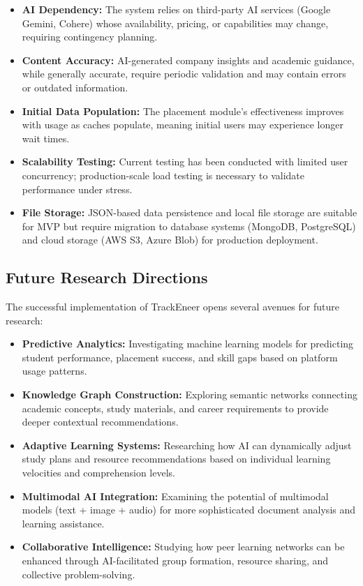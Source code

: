\documentclass[12pt]{article}
\begin{document}
\begin{itemize}
    \item \textbf{AI Dependency:} The system relies on third-party AI services (Google Gemini, Cohere) whose availability, pricing, or capabilities may change, requiring contingency planning.
    
    \item \textbf{Content Accuracy:} AI-generated company insights and academic guidance, while generally accurate, require periodic validation and may contain errors or outdated information.
    
    \item \textbf{Initial Data Population:} The placement module's effectiveness improves with usage as caches populate, meaning initial users may experience longer wait times.
    
    \item \textbf{Scalability Testing:} Current testing has been conducted with limited user concurrency; production-scale load testing is necessary to validate performance under stress.
    
    \item \textbf{File Storage:} JSON-based data persistence and local file storage are suitable for MVP but require migration to database systems (MongoDB, PostgreSQL) and cloud storage (AWS S3, Azure Blob) for production deployment.
\end{itemize}

\subsection{Future Research Directions}
The successful implementation of TrackEneer opens several avenues for future research:

\begin{itemize}
    \item \textbf{Predictive Analytics:} Investigating machine learning models for predicting student performance, placement success, and skill gaps based on platform usage patterns.
    
    \item \textbf{Knowledge Graph Construction:} Exploring semantic networks connecting academic concepts, study materials, and career requirements to provide deeper contextual recommendations.
    
    \item \textbf{Adaptive Learning Systems:} Researching how AI can dynamically adjust study plans and resource recommendations based on individual learning velocities and comprehension levels.
    
    \item \textbf{Multimodal AI Integration:} Examining the potential of multimodal models (text + image + audio) for more sophisticated document analysis and learning assistance.
    
    \item \textbf{Collaborative Intelligence:} Studying how peer learning networks can be enhanced through AI-facilitated group formation, resource sharing, and collective problem-solving.
\end{itemize}
\end{document}
